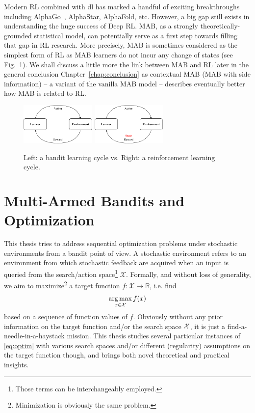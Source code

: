 Modern RL combined with \gls{dl} has marked a handful of exciting breakthroughs including AlphaGo~\citep{silver2016alphago}, AlphaStar, AlphaFold, etc. However, a big gap still exists in understanding the huge success of Deep RL. MAB, as a strongly theoretically-grounded statistical model, can potentially serve as a first step towards filling that gap in RL research. More precisely, MAB is sometimes considered as the simplest form of RL as MAB learners do not incur any change of states (see Fig.~\ref{fig:intro.comparison}). We shall discuss a little more the link between MAB and RL later in the general conclusion Chapter~\ref{chap:conclusion} as contextual MAB (MAB with side information) -- a variant of the vanilla MAB model -- describes eventually better how MAB is related to RL.

\begin{figure}[ht]
    \centering
    \includegraphics[width=0.33\textwidth]{Chapter1/img/mab.pdf}
    \includegraphics[width=0.33\textwidth]{Chapter1/img/rl.pdf}
    \caption{Left: a bandit learning cycle vs. Right: a reinforcement learning cycle.}
    \label{fig:intro.comparison}
\end{figure}

\section{Multi-Armed Bandits and Optimization}\label{sec:intro.mab}
    
This thesis tries to address sequential optimization problems under stochastic environments from a bandit point of view. A stochastic environment refers to an environment from which stochastic feedback are acquired when an input is queried from the search/action space\footnote{Those terms can be interchangeably employed.} $\mathcal{X}$. Formally, and without loss of generality, we aim to maximize\footnote{Minimization is obviously the same problem.} a target function $f:\mathcal{X}\rightarrow\mathbb{R}$, i.e. find 
\begin{equation}\label{eq:optim}
    \operatorname*{arg\,max}_{x\in\mathcal{X}} f(x)
\end{equation}
based on a sequence of function values of $f$. Obviously without any prior information on the target function and/or the search space $\mathcal{X}$, it is just a find-a-needle-in-a-haystack mission. This thesis studies several particular instances of \eqref{eq:optim} with various search spaces and/or different (regularity) assumptions on the target function though, and brings both novel theoretical and practical insights. 

